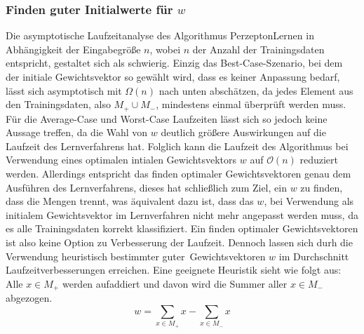 \documentclass[fontsize=11pt]{scrartcl}
\begin{document}
                    \subsubsection{Finden guter Initialwerte für $w$}
                    Die asymptotische Laufzeitanalyse des Algorithmus PerzeptonLernen in Abhängigkeit der Eingabegröße $n$, wobei $n$ der Anzahl der Trainingsdaten entspricht, gestaltet sich als schwierig. Einzig das Best-Case-Szenario, bei dem der initiale Gewichtsvektor so gewählt wird, dass es keiner Anpassung bedarf, lässt sich asymptotisch mit $\Omega(n)$ nach unten abschätzen, da jedes Element aus den Trainingsdaten, also $M_+ \cup M_-$, mindestens einmal überprüft werden muss. Für die Average-Case und Worst-Case Laufzeiten lässt sich so jedoch keine Aussage treffen, da die Wahl von $w$ deutlich größere Auswirkungen auf die Laufzeit des Lernverfahrens hat.
                    Folglich kann die Laufzeit des Algorithmus bei Verwendung eines optimalen intialen Gewichtsvektors $w$ auf $\mathcal{O}(n)$ reduziert werden. Allerdings entspricht das finden optimaler Gewichtsvektoren genau dem Ausführen des Lernverfahrens, dieses hat schließlich zum Ziel, ein $w$ zu finden, dass die Mengen trennt, was äquivalent dazu ist, dass das $w$, bei Verwendung als initialem Gewichtsvektor im Lernverfahren nicht mehr angepasst werden muss, da es alle Trainingsdaten korrekt klassifiziert.
                    Ein finden optimaler Gewichtsvektoren ist also keine Option zu Verbesserung der Laufzeit.
                    \newline
                    Dennoch lassen sich durh die Verwendung heuristisch bestimmter \glqq guter\grqq\  Gewichtsvektoren $w$ im Durchschnitt Laufzeitverbesserungen erreichen.
                    Eine geeignete Heuristik sieht wie folgt aus: 
                    \newline
                    Alle $x\in M_+$ werden aufaddiert und davon wird die Summer aller $x\in M_-$ abgezogen.
                    $$
                        w = \sum_{x \in M_+}x - \sum_{x \in M_-}x
                    $$\cite{ertel2016}
\end{document}
